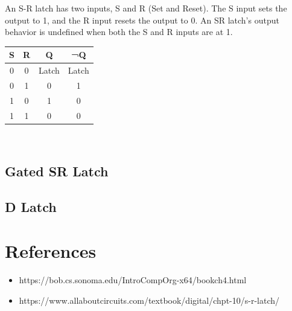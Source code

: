 An S-R latch has two inputs, S and R (Set and Reset). The S input sets the output to 1, and the R input resets the output to 0. An SR latch's output behavior is undefined when both the S and R inputs are at 1. \\

\begin{tabular}{c c c c}
	\hline
	\textbf{S} & \textbf{R} & \textbf{Q} & \textbf{¬Q} \\ 
	\hline
	0 & 0 & Latch & Latch\\
	0 & 1 & 0 & 1\\
	1 & 0 & 1 & 0 \\
	1 & 1 & 0 & 0 \\
	\hline 
\end{tabular} \\

\subsection{Gated SR Latch}

\subsection{D Latch}

\section{References}

\begin{itemize}
	\item https://bob.cs.sonoma.edu/IntroCompOrg-x64/bookch4.html
	\item https://www.allaboutcircuits.com/textbook/digital/chpt-10/s-r-latch/
\end{itemize}
